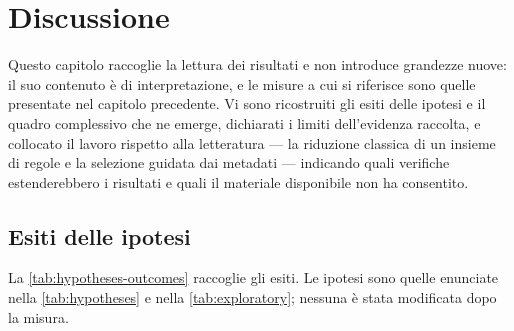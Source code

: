 \chapter{Discussione}\label{chap:discussion}


\noindent Questo capitolo raccoglie la lettura dei risultati e non introduce grandezze nuove: il
suo contenuto è di interpretazione, e le misure a cui si riferisce sono quelle presentate nel
capitolo precedente. Vi sono ricostruiti gli esiti delle ipotesi e il quadro complessivo che ne
emerge, dichiarati i limiti dell'evidenza raccolta, e collocato il lavoro rispetto alla letteratura
--- la riduzione classica di un insieme di regole e la selezione guidata dai metadati ---
indicando quali verifiche estenderebbero i risultati e quali il materiale disponibile non ha
consentito.

\section{Esiti delle ipotesi}\label{sec:hypotheses-outcomes}

La \autoref{tab:hypotheses-outcomes} raccoglie gli esiti. Le ipotesi sono quelle enunciate nella
\autoref{tab:hypotheses} e nella \autoref{tab:exploratory}; nessuna è stata modificata dopo la
misura.

